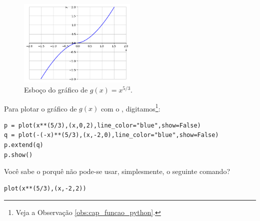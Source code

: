 \begin{resol}
\begin{enumerate}[a)]
    \begin{figure}[H]
      \centering
      \includegraphics[width=0.5\textwidth]{./cap_funcao/dados/fig_exeresol_funpot_graf/fig_exeresol_funpot_graf_b}
      \caption{Esboço do gráfico de $g(x) = x^{5/3}$.}
      \label{fig:exeresol_funpot_graf_b}
    \end{figure}

    \ifispython
    Para plotar o gráfico de $g(x)$ com o \sympy, digitamos\footnote{Veja a Observação \ref{obs:cap_funcao_python}.}:
\begin{verbatim}
p = plot(x**(5/3),(x,0,2),line_color="blue",show=False)
q = plot(-(-x)**(5/3),(x,-2,0),line_color="blue",show=False)
p.extend(q)
p.show()
\end{verbatim}
    Você sabe o porquê não pode-se usar, simplesmente, o seguinte comando?
\begin{verbatim}
plot(x**(5/3),(x,-2,2))
\end{verbatim}
    \fi
  \end{enumerate}
\end{resol}

